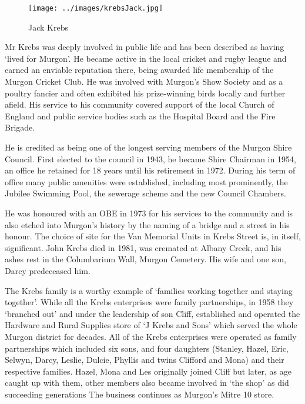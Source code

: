 \begin{figure}
\begin{center}
\texttt{[image: ../images/krebsJack.jpg]}
\caption{Jack Krebs}
\end{center}
\end{figure}




Mr Krebs was deeply involved in public life and has been described as having `lived for Murgon'. He became active in the local cricket and rugby league and earned an enviable reputation there, being awarded life membership of the Murgon Cricket Club. He was involved with Murgon's Show Society and as a poultry fancier and often exhibited his prize-winning birds locally and further afield. His service to his community covered support of the local Church of England and public service bodies such as the Hospital Board and the Fire Brigade.



He is credited as being one of the longest serving members of the Murgon Shire Council. First elected to the council in 1943, he became Shire Chairman in 1954, an office he retained for 18 years until his retirement in 1972. During his term of office many public amenities were established, including most prominently, the Jubilee Swimming Pool, the sewerage scheme and the new Council Chambers.



He was honoured with an OBE in 1973 for his services to the community and is also etched into Murgon's history by the naming of a bridge and a street in his honour. The choice of site for the Van Memorial Units in Krebs Street is, in itself, significant. John Krebs died in 1981, was cremated at Albany Creek, and his ashes rest in the Columbarium Wall, Murgon Cemetery. His wife and one son, Darcy predeceased him.



The Krebs family is a worthy example of `families working together and staying together'. While all the Krebs enterprises were family partnerships, in 1958 they `branched out' and under the leadership of son Cliff, established and operated the Hardware and Rural Supplies store of `J Krebs and Sons' which served the whole Murgon district for decades. All of the Krebs enterprises were operated as family partnerships which included six sons, and four daughters (Stanley, Hazel, Eric, Selwyn, Darcy, Leslie, Dulcie, Phyllis and twins Clifford and Mona) and their respective families. Hazel, Mona and Les originally joined Cliff but later, as age caught up with them, other members also became involved in `the shop' as did succeeding generations The business continues as Murgon's Mitre 10 store.









